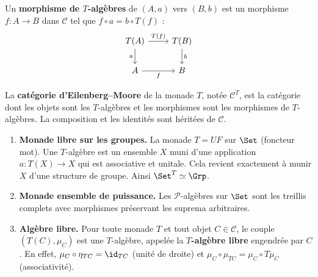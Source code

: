 \begin{definition}\label{def:morphisme-T-algebre}
Un \textbf{morphisme de $T$-algèbres} de $(A, a)$ vers $(B, b)$ est
un morphisme $f \colon A \to B$ dans $\mathcal{C}$ tel que
$f \circ a = b \circ T(f)$ :
\[
\begin{tikzcd}
T(A) \arrow[r, "T(f)"] \arrow[d, "a"'] & T(B) \arrow[d, "b"] \\
A \arrow[r, "f"'] & B
\end{tikzcd}
\]
\end{definition}

\begin{definition}\label{def:categorie-EM}
La \textbf{catégorie d'Eilenberg--Moore} de la monade $T$,
notée $\mathcal{C}^T$, est la catégorie dont les objets sont les
$T$-algèbres et les morphismes sont les morphismes de $T$-algèbres.
La composition et les identités sont héritées de $\mathcal{C}$.
\end{definition}

\begin{exemple}\label{ex:T-algebres}
\begin{enumerate}[label=(\roman*)]
\item \textbf{Monade libre sur les groupes.}
    La monade $T = UF$ sur $\Set$ (foncteur mot).
    Une $T$-algèbre est un ensemble $X$ muni d'une application
    $a \colon T(X) \to X$ qui est associative et unitale.
    Cela revient exactement à munir $X$ d'une structure de groupe.
    Ainsi $\Set^T \simeq \Grp$.

\item \textbf{Monade ensemble de puissance.}
    Les $\mathcal{P}$-algèbres sur $\Set$ sont les treillis complets
    avec morphismes préservant les suprema arbitraires.

\item \textbf{Algèbre libre.}
    Pour toute monade $T$ et tout objet $C \in \mathcal{C}$,
    le couple $(T(C), \mu_C)$ est une $T$-algèbre, appelée
    la \textbf{$T$-algèbre libre}
    engendrée par $C$.
    En effet, $\mu_C \circ \eta_{TC} = \id_{TC}$ (unité de droite)
    et $\mu_C \circ \mu_{TC} = \mu_C \circ T\mu_C$ (associativité).
\end{enumerate}
\end{exemple}

